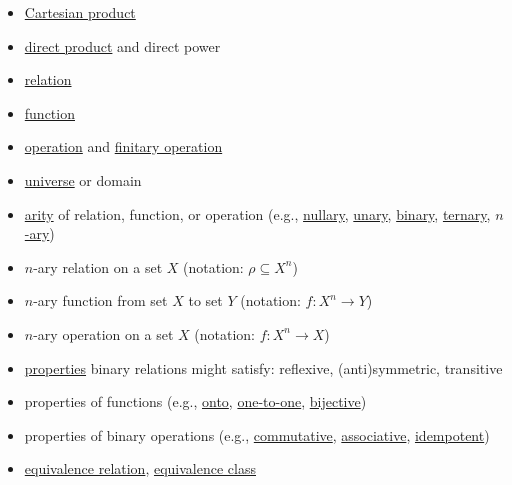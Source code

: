 \documentclass[12pt]{article}
\newcommand{\boldemph}[1]{#1}
\newcommand{\defn}[1]{#1}
\newcommand\<{\ensuremath{\langle}}
\renewcommand\>{\ensuremath{\rangle}}
\begin{document}
\begin{itemize}
\item \href{http://en.wikipedia.org/wiki/Cartesian_product}{Cartesian product}
\item \href{http://en.wikipedia.org/wiki/Direct_product}{\defn{direct product}} and \defn{direct power}
\item \href{http://en.wikipedia.org/wiki/Finitary_relation}{relation}
\item \href{http://en.wikipedia.org/wiki/Function_(mathematics)}{function}
\item \href{http://en.wikipedia.org/wiki/Operation_(mathematics)}{operation} and 
  \href{http://en.wikipedia.org/wiki/Finitary}{finitary operation}
\item \href{http://en.wikipedia.org/wiki/Structure_(mathematical_logic)#Domain}{universe} or domain
\item \href{http://en.wikipedia.org/wiki/Arity}{arity} of relation, function, or operation 
  (e.g., 
  \href{http://en.wikipedia.org/wiki/Arity#Nullary}{nullary}, 
  \href{http://en.wikipedia.org/wiki/Arity#Unary}{unary}, 
  \href{http://en.wikipedia.org/wiki/Arity#Binary}{binary}, 
  \href{http://en.wikipedia.org/wiki/Arity#Ternary}{ternary},
  \href{http://en.wikipedia.org/wiki/Arity#n-ary}{$n$-ary})
\item $n$-ary relation on a set $X$ (notation: $\rho \subseteq X^n$)
\item $n$-ary function from set $X$ to set $Y$ (notation: $f: X^n \rightarrow Y$)
\item $n$-ary operation on a set $X$ (notation: $f: X^n \rightarrow X$)
\item \href{http://en.wikipedia.org/wiki/Binary_relation#Relations_over_a_set}{properties} binary relations might satisfy: \boldemph{reflexive},
  \boldemph{(anti)symmetric}, \boldemph{transitive}
\item properties of functions (e.g., 
\href{http://en.wikipedia.org/wiki/Surjective_function}{onto}, 
\href{http://en.wikipedia.org/wiki/Injective_function}{one-to-one}, 
\href{http://en.wikipedia.org/wiki/Bijection}{bijective})
\item properties of binary operations 
(e.g., \href{http://en.wikipedia.org/wiki/Commutative_property}{commutative}, 
  \href{http://en.wikipedia.org/wiki/Associative_property}{associative}, 
  \href{http://en.wikipedia.org/wiki/Idempotence}{idempotent})
\item \href{http://en.wikipedia.org/wiki/Equivalence_relation}{equivalence relation},
\href{http://en.wikipedia.org/wiki/Equivalence_class}{equivalence class}

\end{itemize}
\end{document}
